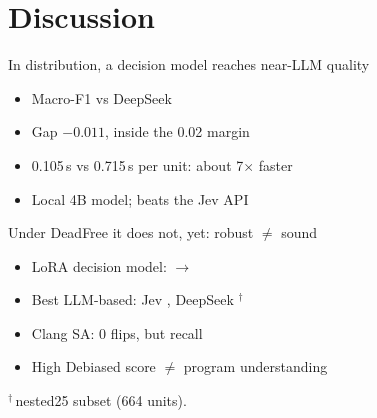 \section{Discussion}

\begin{frame}{In distribution, a decision model reaches near-LLM quality}
  \begin{itemize}
    \item Macro-F1  vs DeepSeek 
    \item Gap $-0.011$, inside the 0.02 margin
    \item 0.105\,s vs 0.715\,s per unit: about 7$\times$ faster
    \item Local 4B model; beats the Jev API
  \end{itemize}
  \vspace{10pt}
  \centering
\end{frame}

\begin{frame}{Under DeadFree it does not, yet: robust $\neq$ sound}
  \begin{itemize}
    \item LoRA decision model:  $\to$ \alert{}
    \item Best LLM-based: Jev , DeepSeek $^\dagger$
    \item Clang SA: 0 flips, but recall 
    \item High Debiased score $\neq$ program understanding
  \end{itemize}
  \vspace{10pt}
  \centering
  \vfill
  {\scriptsize $^\dagger$\,nested25 subset (664 units).\par}
\end{frame}

